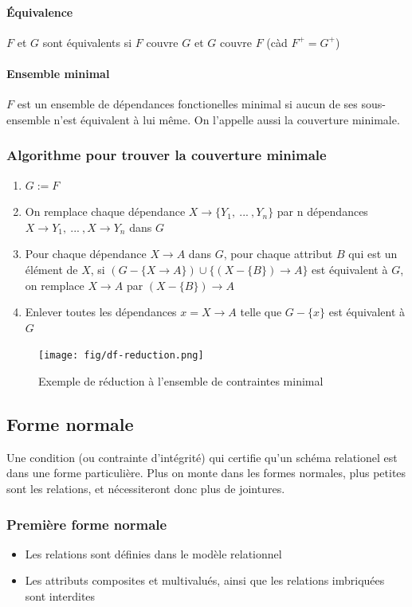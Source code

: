 \documentclass[a4paper]{article}
\begin{document}
\paragraph{\'Equivalence} $F$ et $G$ sont équivalents si $F$ couvre $G$ et $G$ couvre $F$ (càd $F^+ = G^+$)
\paragraph{Ensemble minimal} $F$ est un ensemble de dépendances fonctionelles minimal
si aucun de ses sous-ensemble n'est équivalent à lui même. On l'appelle aussi la
couverture minimale.

\subsubsection{Algorithme pour trouver la couverture minimale}
\begin{enumerate}
  \item $G := F$
  \item On remplace chaque dépendance $X \rightarrow \{Y_1,~...~,Y_n\}$ par n dépendances
        $X \rightarrow Y_1,~...~, X \rightarrow Y_n$ dans $G$
  \item Pour chaque dépendance $X \rightarrow A$ dans $G$, pour chaque attribut $B$
        qui est un élément de $X$, si $(G-\{X\rightarrow A\})\cup\{(X-\{B\}) \rightarrow A\}$ est
        équivalent à $G$, on remplace $X \rightarrow A $ par $(X-\{B\}) \rightarrow A$
  \item Enlever toutes les dépendances $x = X \rightarrow A$ telle que $G-\{x\}$ est équivalent à $G$ 
\end{enumerate}

\begin{figure}[H]
\center
\texttt{[image: fig/df-reduction.png]}
\caption{Exemple de réduction à l'ensemble de contraintes minimal}
\end{figure}

\subsection{Forme normale}
Une condition (ou contrainte d'intégrité) qui certifie qu'un schéma relationel
est dans une forme particulière. Plus on monte dans les formes normales, plus petites
sont les relations, et nécessiteront donc plus de jointures.

\subsubsection{Première forme normale}
\begin{itemize}
  \item Les relations sont définies dans le modèle relationnel
  \item Les attributs composites et multivalués, ainsi que les relations imbriquées
        sont interdites
\end{itemize}
\end{document}
